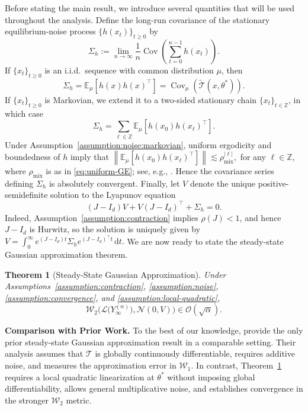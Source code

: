 \documentclass[11pt,letterpaper]{article}
\theoremstyle{plain}
\newtheorem{theorem}{Theorem}
\theoremstyle{definition}
\theoremstyle{remark}
\newcommand{\E}{\mathbb{E}}
\newcommand{\mT}{\mathcal{T}}
\newcommand{\W}{\mathcal{W}}
\newcommand{\tmT}{\widetilde{\mT}}
\newcommand{\law}{\mathcal{L}}
\begin{document}
Before stating the main result, we introduce several quantities that will be
used throughout the analysis.  Define the long-run covariance of the stationary equilibrium-noise process
\(\{h(x_t)\}_{t\geq0}\) by
\[
    \Sigma_h
    :=
    \lim_{n\to\infty}
    \frac{1}{n}
    \operatorname{Cov}\!\left(
        \sum_{t=0}^{n-1}h(x_t)
    \right).
\] 
If \(\{x_t\}_{t\geq0}\) is an i.i.d.\ sequence with common distribution
\(\mu\), then
\[
    \Sigma_h
    =
    \E_{\mu}\!\left[h(x)h(x)^\top\right]
    =
    \operatorname{Cov}_{\mu}\!\left(
        \tmT(x,\theta^*)
    \right).
\]
If \(\{x_t\}_{t\geq0}\) is Markovian, we extend it to a two-sided stationary
chain \(\{x_t\}_{t\in\mathbb Z}\), in which case
\[
    \Sigma_h
    =
    \sum_{\ell\in\mathbb Z}
    \E_{\mu}\!\left[
        h(x_0)h(x_\ell)^\top
    \right].
\]
Under Assumption~\ref{assumption:noise:markovian}, uniform 
ergodicity and boundedness of $h$ imply that $\left\|
        \E_\mu\!\left[h(x_0)h(x_\ell)^\top\right]
    \right\|
    \lesssim \rho_{\mathrm{mix}}^{|\ell|},$ for any $\ell\in\mathbb Z$,
where \(\rho_{\mathrm{mix}}\) is as in \eqref{eq:uniform-GE}; see, e.g.,
\cite[Chapter~16]{Meyn12_book}.
Hence the covariance series defining $\Sigma_h$ is absolutely convergent. Finally, let \(V\) denote the unique positive-semidefinite solution to the
Lyapunov equation
\begin{equation}\label{eq:Lyapunov}
(J-I_d)V + V(J-I_d)^\top + \Sigma_h = 0.
\end{equation}
Indeed, Assumption~\ref{assumption:contraction} implies
\(\rho(J)<1\), and hence \(J-I_d\) is Hurwitz, so the solution is uniquely
given by $V
    =
    \int_0^\infty
    e^{(J-I_d)t}\Sigma_h e^{(J-I_d)^\top t}\,\mathrm dt.$ We are now ready to state the steady-state Gaussian approximation theorem.


\begin{theorem}[Steady-State Gaussian Approximation]
\label{thm:steady-state-gaussian-approx}
Under Assumptions~\ref{assumption:contraction},
\ref{assumption:noise}, \ref{assumption:convergence}, and
\ref{assumption:local-quadratic},
\[
        \W_2\Big(
            \law\big(Y_\infty^{(\alpha)}\big),
            \mathcal N(0,V)
        \Big)
         \in
    \mathcal{O}(\sqrt{\alpha}).
    \]
\end{theorem}


\noindent\textbf{Comparison with Prior Work.}
To the best of our knowledge, \cite{wang2026steady} provide the only prior
steady-state Gaussian approximation result in a comparable setting. Their
analysis assumes that $\mT$ is globally continuously differentiable, requires
additive noise, and measures the approximation error in $\W_1$. In contrast,
Theorem~\ref{thm:steady-state-gaussian-approx} requires a local quadratic
linearization at $\theta^*$ without imposing global differentiability,
allows general multiplicative noise, and establishes convergence in the
stronger $\W_2$ metric.
\end{document}
